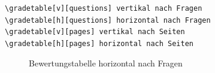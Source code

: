 \begin{lstlisting}[caption={Befehle für Bewertungstabellen},label={lis:bew}]
\gradetable[v][questions] vertikal nach Fragen
\gradetable[h][questions] horizontal nach Fragen
\gradetable[v][pages] vertikal nach Seiten
\gradetable[h][pages] horizontal nach Seiten
\end{lstlisting}

\begin{figure}[b]
\caption{Bewertungstabelle horizontal nach Fragen}\label{fig:hor}
\end{figure}

